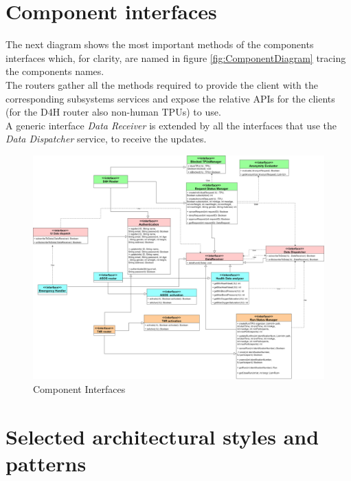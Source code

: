 \section{Component interfaces}
The next diagram shows the most important methods of the components interfaces which, for clarity, are named in figure \ref{fig:ComponentDiagram} tracing the components names.\\
The routers gather all the methods required to provide the client with the corresponding subsystems services and expose the relative APIs for the clients (for the D4H router also non-human TPUs) to use. \\
A generic interface \textit{Data Receiver} is extended by all the interfaces that use the \textit{Data Dispatcher} service, to receive the updates.
\begin{figure}[H]
\caption{Component Interfaces}
\centering
\includegraphics[width = \textwidth]{sections/architecturalDesign/componentInterfaces.png}
\end{figure}
\section{Selected architectural styles and patterns}
